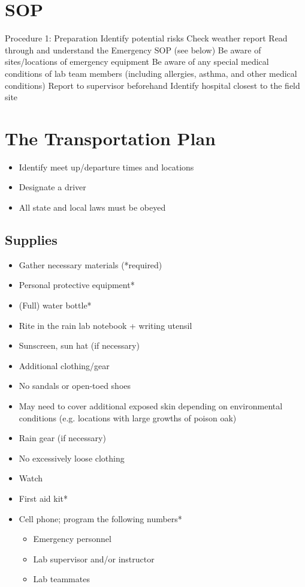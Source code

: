 \documentclass[12pt]{../SOP2}
\begin{document}
\section{SOP}

Procedure 1: Preparation
Identify potential risks
Check weather report
Read through and understand the Emergency SOP (see below)
Be aware of sites/locations of emergency equipment
Be aware of any special medical conditions of lab team members (including allergies, asthma, and other medical conditions)
Report to supervisor beforehand
Identify hospital closest to the field site


\section{The Transportation Plan}

\begin{itemize}
  \item Identify meet up/departure times and locations
  \item Designate a driver
  \item All state and local laws must be obeyed
\end{itemize}

\subsection{Supplies}

\begin{itemize}
  \item Gather necessary materials (*required)
  \item Personal protective equipment*
  \item (Full) water bottle*
  \item Rite in the rain lab notebook + writing utensil
  \item Sunscreen, sun hat (if necessary)
  \item Additional clothing/gear
  \item No sandals or open-toed shoes
  \item May need to cover additional exposed skin depending on environmental conditions (e.g. locations with large growths of poison oak)
  \item Rain gear (if necessary)
  \item No excessively loose clothing
  \item Watch
  \item First aid kit*
  \item Cell phone; program the following numbers*
\begin{itemize}
  \item Emergency personnel
  \item Lab supervisor and/or instructor
  \item Lab teammates
\end{itemize}
\end{itemize}
\end{document}
